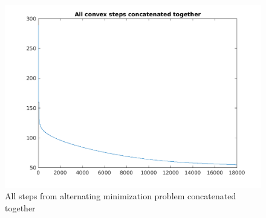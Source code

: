 \documentclass{article}
\newcommand{\0}{\mathrm{0}}
\newcommand{\1}{\mathrm{1}}
\begin{document}
\begin{figure}
  \includegraphics[width=\textwidth]{fixed-step-all.png}
  \caption{All steps from alternating minimization problem concatenated together}
\end{figure}
\fi
\end{document}
